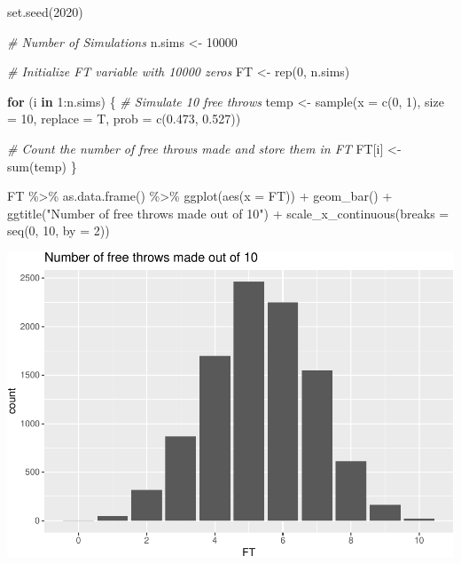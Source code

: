 \documentclass[
  11pt,
]{book}
\newenvironment{Shaded}{\begin{snugshade}}{\end{snugshade}}
\newcommand{\AttributeTok}[1]{\textcolor[rgb]{0.77,0.63,0.00}{#1}}
\newcommand{\CommentTok}[1]{\textcolor[rgb]{0.56,0.35,0.01}{\textit{#1}}}
\newcommand{\ControlFlowTok}[1]{\textcolor[rgb]{0.13,0.29,0.53}{\textbf{#1}}}
\newcommand{\DecValTok}[1]{\textcolor[rgb]{0.00,0.00,0.81}{#1}}
\newcommand{\FloatTok}[1]{\textcolor[rgb]{0.00,0.00,0.81}{#1}}
\newcommand{\FunctionTok}[1]{\textcolor[rgb]{0.00,0.00,0.00}{#1}}
\newcommand{\NormalTok}[1]{#1}
\newcommand{\OtherTok}[1]{\textcolor[rgb]{0.56,0.35,0.01}{#1}}
\newcommand{\SpecialCharTok}[1]{\textcolor[rgb]{0.00,0.00,0.00}{#1}}
\newcommand{\StringTok}[1]{\textcolor[rgb]{0.31,0.60,0.02}{#1}}
\theoremstyle{definition}
\theoremstyle{definition}
\theoremstyle{definition}
\theoremstyle{definition}
\theoremstyle{remark}
\begin{document}
\begin{Shaded}
\begin{Highlighting}[]
\FunctionTok{set.seed}\NormalTok{(}\DecValTok{2020}\NormalTok{)}

\CommentTok{\# Number of Simulations}
\NormalTok{n.sims }\OtherTok{\textless{}{-}} \DecValTok{10000}

\CommentTok{\# Initialize FT variable with 10000 zeros}
\NormalTok{FT }\OtherTok{\textless{}{-}} \FunctionTok{rep}\NormalTok{(}\DecValTok{0}\NormalTok{, n.sims)}

\ControlFlowTok{for}\NormalTok{ (i }\ControlFlowTok{in} \DecValTok{1}\SpecialCharTok{:}\NormalTok{n.sims) \{}
    \CommentTok{\# Simulate 10 free throws}
\NormalTok{    temp }\OtherTok{\textless{}{-}} \FunctionTok{sample}\NormalTok{(}\AttributeTok{x =} \FunctionTok{c}\NormalTok{(}\DecValTok{0}\NormalTok{, }\DecValTok{1}\NormalTok{), }\AttributeTok{size =} \DecValTok{10}\NormalTok{, }\AttributeTok{replace =}\NormalTok{ T, }\AttributeTok{prob =} \FunctionTok{c}\NormalTok{(}\FloatTok{0.473}\NormalTok{, }\FloatTok{0.527}\NormalTok{))}

    \CommentTok{\# Count the number of free throws made and store them in FT}
\NormalTok{    FT[i] }\OtherTok{\textless{}{-}} \FunctionTok{sum}\NormalTok{(temp)}
\NormalTok{\}}

\NormalTok{FT }\SpecialCharTok{\%\textgreater{}\%}
    \FunctionTok{as.data.frame}\NormalTok{() }\SpecialCharTok{\%\textgreater{}\%}
    \FunctionTok{ggplot}\NormalTok{(}\FunctionTok{aes}\NormalTok{(}\AttributeTok{x =}\NormalTok{ FT)) }\SpecialCharTok{+} \FunctionTok{geom\_bar}\NormalTok{() }\SpecialCharTok{+} \FunctionTok{ggtitle}\NormalTok{(}\StringTok{"Number of free throws made out of 10"}\NormalTok{) }\SpecialCharTok{+}
    \FunctionTok{scale\_x\_continuous}\NormalTok{(}\AttributeTok{breaks =} \FunctionTok{seq}\NormalTok{(}\DecValTok{0}\NormalTok{, }\DecValTok{10}\NormalTok{, }\AttributeTok{by =} \DecValTok{2}\NormalTok{))}
\end{Highlighting}
\end{Shaded}

\includegraphics{series_files/figure-latex/unnamed-chunk-67-1.pdf}
\end{document}
